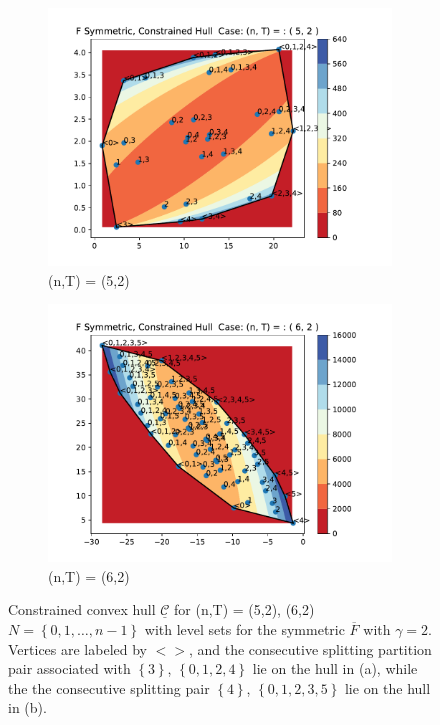 \documentclass{article}
\theoremstyle{case}
\begin{document}
\vspace{16pt}
\begin{figure}
\centering
\begin{subfigure}{.5\textwidth}
  \centering
  \includegraphics[scale=.55]{const_hull_5_2.pdf}
  \caption{(n,T) = (5,2)}
  \label{fig:sub1}
\end{subfigure}%
\begin{subfigure}{.5\textwidth}
  \centering
  \includegraphics[scale=.55]{const_hull_6_2.pdf}
  \caption{(n,T) = (6,2)}
  \label{fig:sub2}
\end{subfigure}
\caption{Constrained convex hull $\underline{\mathcal{C}}$ for (n,T) = (5,2), (6,2) $N = \left\lbrace 0,1, \dots, n-1 \right\rbrace$ with level sets for the symmetric $\overline{F}$ with $\gamma = 2$. Vertices are labeled by $<>$, and the consecutive splitting partition pair associated with $\left\lbrace 3\right\rbrace$, $\left\lbrace 0, 1, 2, 4\right\rbrace$ lie on the hull in (a), while the the consecutive splitting pair $\left\lbrace 4\right\rbrace$, $\left\lbrace 0, 1, 2, 3, 5\right\rbrace$ lie on the hull in (b).}
\label{fig:hull1}
\end{figure}
\end{document}
